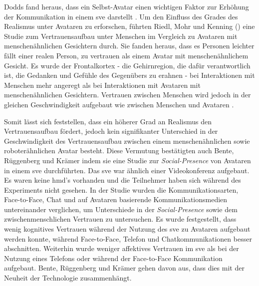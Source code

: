\documentclass[a4paper,11pt]{article}%
\renewcommand{\\}{\vspace*{0.5\baselineskip} \newline}
\begin{document}
Dodds fand heraus, dass ein Selbst-Avatar einen wichtigen Faktor zur Erhöhung der Kommunikation in einem \ac{sve} darstellt \citep[1-11]{dodds2011talk}.
\label{AvatarTrust}
Um den Einfluss des Grades des Realismus unter Avataren zu erforschen, führten Riedl, Mohr und Kenning (\citep{riedl2014trusting}) eine Studie zum Vertrauensaufbau unter Menschen im Vergleich zu Avataren mit menschenähnlichen Gesichtern durch. Sie fanden heraus, dass es Personen leichter fällt einer realen Person, zu vertrauen als einem Avatar mit menschenähnlichem Gesicht. Es wurde der Frontalkortex - die Gehirnregion, die dafür verantwortlich ist, die Gedanken und Gefühle des Gegenübers zu erahnen - bei Interaktionen mit Menschen mehr angeregt als bei Interaktionen mit Avataren mit menschenähnlichen Gesichtern.
Vertrauen zwischen Menschen wird jedoch in der gleichen Geschwindigkeit aufgebaut wie zwischen Menschen und Avataren \citep{riedl2014trusting}.

Somit lässt sich feststellen, dass ein höherer Grad an Realismus den Vertrauensaufbau fördert, jedoch kein signifikanter Unterschied in der Geschwindigkeit  des Vertrauensaufbau zwischen einem menschenähnlichen sowie roboterähnlichen Avatar besteht. Diese Vermutung bestätigten auch Bente, Rüggenberg und Krämer \citep[p.54-59]{bente2004social} indem sie eine Studie zur \textit{Social-Presence} von Avataren in einem \ac{sve} durchführten. Das \ac{sve} war ähnlich einer Videokonferenz aufgebaut. Es waren keine \ac{hmd}'s vorhanden und die Teilnehmer haben sich während des Experiments nicht gesehen. In der Studie wurden die Kommunikationsarten, Face-to-Face, Chat und auf Avataren basierende Kommunikationsmedien untereinander verglichen, um Unterschiede in der \textit{Social-Presence} sowie dem zwischenmenschlichen Vertrauen zu untersuchen.
Es wurde festgestellt, dass wenig kognitives Vertrauen während der Nutzung des \ac{sve} zu Avataren aufgebaut werden konnte, während Face-to-Face, Telefon und Chatkommunikationen besser abschnitten. Weiterhin wurde weniger affektives Vertrauen im \ac{sve} als bei der Nutzung eines Telefons oder während der Face-to-Face Kommunikation aufgebaut.
Bente, Rüggenberg und Krämer \citep[p.54-59]{bente2004social} gehen davon aus, dass dies mit der Neuheit der Technologie zusammenhängt.
\end{document}
